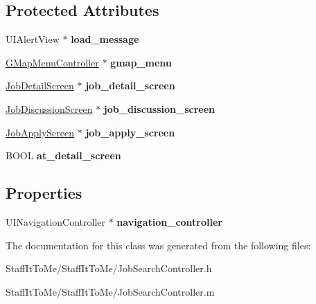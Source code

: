 \subsection*{\-Protected \-Attributes}
\begin{DoxyCompactItemize}
\item 
\hypertarget{interface_job_search_controller_abdf8def9284bb506c776f7fda3d7d1af}{
\-U\-I\-Alert\-View $\ast$ {\bfseries load\-\_\-message}}
\label{interface_job_search_controller_abdf8def9284bb506c776f7fda3d7d1af}

\item 
\hypertarget{interface_job_search_controller_a8c805b4d389bf95cc4e2040d0c4a0165}{
\hyperlink{interface_g_map_menu_controller}{\-G\-Map\-Menu\-Controller} $\ast$ {\bfseries gmap\-\_\-menu}}
\label{interface_job_search_controller_a8c805b4d389bf95cc4e2040d0c4a0165}

\item 
\hypertarget{interface_job_search_controller_ae5cfa4f7efcdea47eccd2eb408625715}{
\hyperlink{interface_job_detail_screen}{\-Job\-Detail\-Screen} $\ast$ {\bfseries job\-\_\-detail\-\_\-screen}}
\label{interface_job_search_controller_ae5cfa4f7efcdea47eccd2eb408625715}

\item 
\hypertarget{interface_job_search_controller_a3ea01d1ea1b1bf32f3b197934ee6c21f}{
\hyperlink{interface_job_discussion_screen}{\-Job\-Discussion\-Screen} $\ast$ {\bfseries job\-\_\-discussion\-\_\-screen}}
\label{interface_job_search_controller_a3ea01d1ea1b1bf32f3b197934ee6c21f}

\item 
\hypertarget{interface_job_search_controller_a5be28bba855003c76b5a60815ab371b9}{
\hyperlink{interface_job_apply_screen}{\-Job\-Apply\-Screen} $\ast$ {\bfseries job\-\_\-apply\-\_\-screen}}
\label{interface_job_search_controller_a5be28bba855003c76b5a60815ab371b9}

\item 
\hypertarget{interface_job_search_controller_a4956dd5e4e512cbbb4e32f4100e65bf9}{
\-B\-O\-O\-L {\bfseries at\-\_\-detail\-\_\-screen}}
\label{interface_job_search_controller_a4956dd5e4e512cbbb4e32f4100e65bf9}

\end{DoxyCompactItemize}
\subsection*{\-Properties}
\begin{DoxyCompactItemize}
\item 
\hypertarget{interface_job_search_controller_a71c47d8f382e4e870615bc775a6f7b82}{
\-U\-I\-Navigation\-Controller $\ast$ {\bfseries navigation\-\_\-controller}}
\label{interface_job_search_controller_a71c47d8f382e4e870615bc775a6f7b82}

\end{DoxyCompactItemize}


\-The documentation for this class was generated from the following files\-:\begin{DoxyCompactItemize}
\item 
\-Staff\-It\-To\-Me/\-Staff\-It\-To\-Me/\-Job\-Search\-Controller.\-h\item 
\-Staff\-It\-To\-Me/\-Staff\-It\-To\-Me/\-Job\-Search\-Controller.\-m\end{DoxyCompactItemize}
